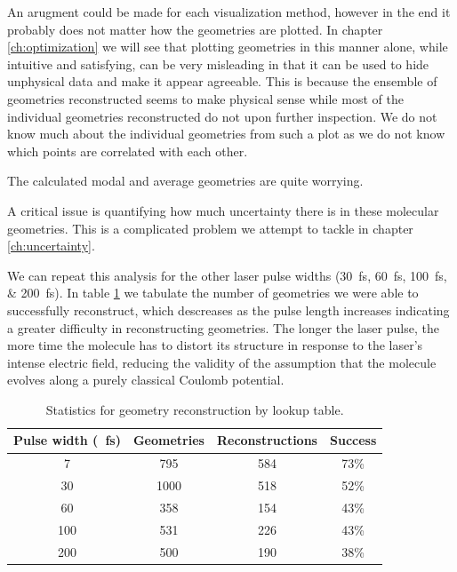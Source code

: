 An arugment could be made for each visualization method, however in the end it probably does not matter how the geometries are plotted. In chapter \ref{ch:optimization} we will see that plotting geometries in this manner alone, while intuitive and satisfying, can be very misleading in that it can be used to hide unphysical data and make it appear agreeable. This is because the ensemble of geometries reconstructed seems to make physical sense while most of the individual geometries reconstructed do not upon further inspection. We do not know much about the individual geometries from such a plot as we do not know which points are correlated with each other.

The calculated modal and average geometries are quite worrying. %

A critical issue is quantifying how much uncertainty there is in these molecular geometries. This is a complicated problem we attempt to tackle in chapter \ref{ch:uncertainty}.

We can repeat this analysis for the other laser pulse widths (\SIlist{30;60;100;200}{\fs}). In table \ref{table:lookupTableSuccess} we tabulate the number of geometries we were able to successfully reconstruct, which descreases as the pulse length increases indicating a greater difficulty in reconstructing geometries. The longer the laser pulse, the more time the molecule has to distort its structure in response to the laser's intense electric field, reducing the validity of the assumption that the molecule evolves along a purely classical Coulomb potential.

\begin{table}
  \myfloatalign
  \centering
  \begin{tabularx}{0.875\textwidth}{cccc}
    \toprule
    Pulse width (\SI{}{\fs}) & Geometries & Reconstructions & Success \\
    \midrule
    7 & 795 & 584 & 73\% \\
    30 & 1000 & 518 & 52\% \\
    60 & 358 & 154 & 43\% \\
    100 & 531 & 226 & 43\% \\
    200 & 500 & 190 & 38\% \\
    \bottomrule
  \end{tabularx}
  \caption[Statistics for geometry reconstruction by lookup table.]
  {Statistics for geometry reconstruction by lookup table.}
  \label{table:lookupTableSuccess}
\end{table}


